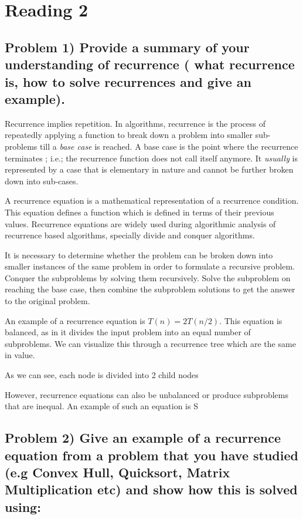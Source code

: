 \documentclass[
]{article}
\author{}
\date{}
\begin{document}
\section{Reading 2}\label{reading-2}

\subsection{Problem 1) Provide a summary of your understanding of
recurrence ( what recurrence is, how to solve recurrences and give an
example).}\label{problem-1-provide-a-summary-of-your-understanding-of-recurrence--what-recurrence-is-how-to-solve-recurrences-and-give-an-example}

Recurrence implies repetition. In algorithms, recurrence is the process
of repeatedly applying a function to break down a problem into smaller
sub-problems till a \emph{base case} is reached. A base case is the
point where the recurrence terminates ; i.e.; the recurrence function
does not call itself anymore. It \emph{usually} is represented by a case
that is elementary in nature and cannot be further broken down into
sub-cases.

A recurrence equation is a mathematical representation of a recurrence
condition. This equation defines a function which is defined in terms of
their previous values. Recurrence equations are widely used during
algorithmic analysis of recurrence based algorithms, specially divide
and conquer algorithms.

It is necessary to determine whether the problem can be broken down into
smaller instances of the same problem in order to formulate a recursive
problem.\\
Conquer the subproblems by solving them recursively. Solve the
subproblem on reaching the base case, then combine the subproblem
solutions to get the answer to the original problem.

An example of a recurrence equation is \(T(n) = 2T(n/2)\). This equation
is balanced, as in it divides the input problem into an equal number of
subproblems. We can visualize this through a recurrence tree which are
the same in value.

As we can see, each node is divided into 2 child nodes

However, recurrence equations can also be
\textquotesingle unbalanced\textquotesingle{} or produce subproblems
that are inequal. An example of such an equation is S

\subsection{Problem 2) Give an example of a recurrence equation from a
problem that you have studied (e.g Convex Hull, Quicksort, Matrix
Multiplication etc) and show how this is solved
using:}\label{problem-2-give-an-example-of-a-recurrence-equation-from-a-problem-that-you-have-studied-eg-convex-hull-quicksort-matrix-multiplication-etc-and-show-how-this-is-solved-using}
\end{document}
